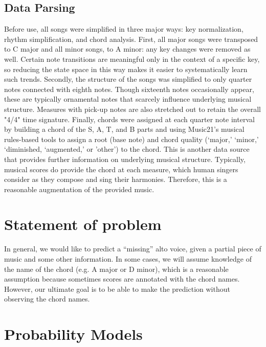 \documentclass[11pt]{article}
\newcommand{\eat}[1]{}
\begin{document}
\subsection{Data Parsing}
Before use, all songs were simplified in three major ways: key normalization, rhythm simplification, and chord analysis. First, all major songs were transposed to C major and all minor songs, to A minor: any key changes were removed as well. Certain note transitions are meaningful only in the context of a specific key, so reducing the state space in this way makes it easier to systematically learn such trends. Secondly, the structure of the songs was simplified to only quarter notes connected with eighth notes. Though sixteenth notes occasionally appear, these are typically ornamental notes that scarcely influence underlying musical structure. Measures with pick-up notes are also stretched out to retain the overall "4/4" time signature. Finally, chords were assigned at each quarter note interval by building a chord of the S, A, T, and B parts and using Music21's musical rules-based tools to assign a root (base note) and chord quality (`major,' `minor,' `diminished, `augmented,' or 'other') to the chord. This is another data source that provides further information on underlying musical structure. Typically, musical scores do provide the chord at each measure, which human singers consider as they compose and sing their harmonies. Therefore, this is a reasonable augmentation of the provided music.  

\section{Statement of problem}

In general, we would like to predict a ``missing'' alto voice, given a partial piece of music and some other information. In some cases, we will assume knowledge of the name of the chord (e.g. A major or D minor), which is a reasonable assumption because sometimes scores are annotated with the chord names. However, our ultimate goal is to be able to make the prediction without observing the chord names.

\eat{\begin{figure}[ht]
\texttt{[image: score.png]}
\caption{Bach chorale with missing alto part}
\end{figure}}



\section{Probability Models}
\end{document}
